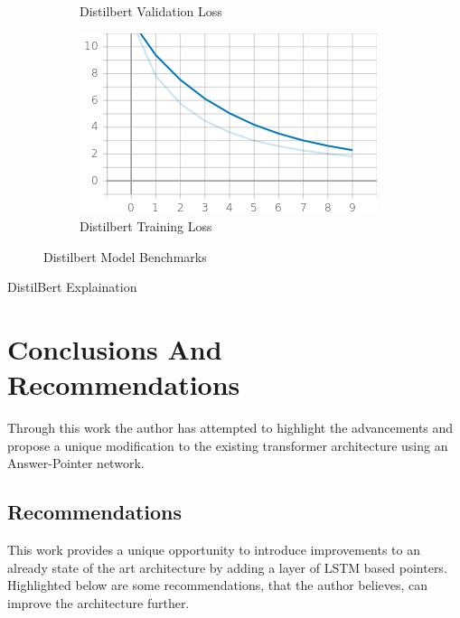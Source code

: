\documentclass[a4paper,12pt]{report}
\begin{document}
\begin{figure}
\begin{subfigure}[b]{0.475\textwidth}
		\caption{\small Distilbert Validation Loss}
		\label{DistilbertValLoss}
	\end{subfigure}
	\hfill
	\begin{subfigure}[b]{0.475\textwidth}
		\centering
		\includegraphics[width=\textwidth]{../images/Distilbert_Train_Loss.png}
		\caption{\small Distilbert Training Loss}
		\label{DistilbertTrainloss}
	\end{subfigure}
	\caption{Distilbert Model Benchmarks}
	\label{distilbertBenchmarks}
\end{figure}

DistilBert Explaination


    \chapter{Conclusions And Recommendations}\label{c6}

    Through this work the author has attempted to highlight the advancements and propose a unique modification to the existing transformer architecture using an Answer-Pointer network.

    \section{Recommendations}

    This work provides a unique opportunity to introduce improvements to an already state of the art architecture by adding a layer of LSTM based pointers. Highlighted below are some recommendations, that the author believes, can improve the architecture further.
\end{document}
